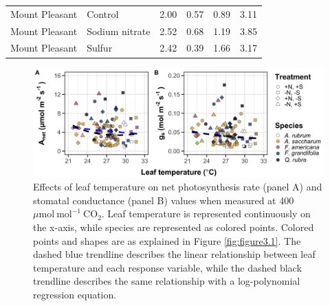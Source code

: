 \begin{landscape}
\begin{table}[]
\begin{tabular}{p{3cm}p{3.5cm}p{1.5cm}p{1.5cm}p{2.75cm}p{2.75cm}}
        Mount Pleasant & Control          & \multicolumn{1}{r}{2.00}    & \multicolumn{1}{r}{0.57}  & \multicolumn{1}{r}{0.89}          & \multicolumn{1}{r}{3.11}   \\
        Mount Pleasant & Sodium nitrate   & \multicolumn{1}{r}{2.52}    & \multicolumn{1}{r}{0.68}  & \multicolumn{1}{r}{1.19}          & \multicolumn{1}{r}{3.85}   \\
        Mount Pleasant & Sulfur           & \multicolumn{1}{r}{2.42}    & \multicolumn{1}{r}{0.39}  & \multicolumn{1}{r}{1.66}          & \multicolumn{1}{r}{3.17} \\
        \hline        
    \end{tabular}%
    \end{table}
\end{landscape}
\clearpage

\newpage
\begin{landscape}
    \begin{figure}
        \centering
        \includegraphics[scale = 0.07]{ch3_NxpH/figs/NxS_figS1_leaftemp.png}
        \caption[Effects of leaf temperature on net photosynthesis rate and stomatal conductance values when measured at 400 $\mu \mathrm{mol\ mol^{-1}\ CO_2}$]{Effects of leaf temperature on net photosynthesis rate (panel A) and stomatal conductance (panel B) values when measured at 400 $\mu \mathrm{mol\ mol^{-1}\ CO_2}$. Leaf temperature is represented continuously on the x-axis, while species are represented as colored points. Colored points and shapes are as explained in Figure \ref{fig:figure3.1}. The dashed blue trendline describes the linear relationship between leaf temperature and each response variable, while the dashed black trendline describes the same relationship with a log-polynomial regression equation.}
        \label{fig:figure.b1}
    \end{figure}
\end{landscape}
\clearpage
